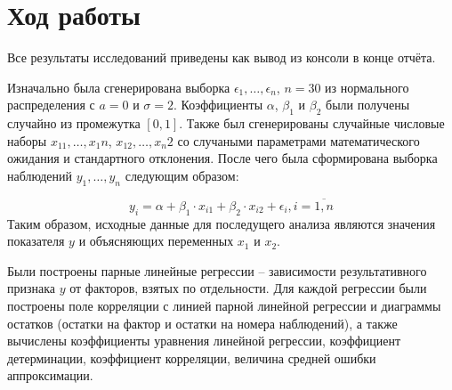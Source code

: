 \section{Ход работы}

Все результаты исследований приведены как вывод из консоли в конце отчёта.

Изначально была сгенерирована выборка $\epsilon_1, \ldots, \epsilon_n$, $n = 30$ из нормального распределения с $a = 0$ и $\sigma = 2$. Коэффициенты $\alpha$, $\beta_1$ и $\beta_2$ были получены случайно из промежутка $[0,1]$. Также был сгенерированы случайные числовые наборы $x_11, \ldots, x_1n$, $x_12, \ldots, x_n2$ со случаными параметрами математического ожидания и стандартного отклонения. После чего была сформирована выборка наблюдений $y_1, \ldots, y_n$ следующим образом:

\begin{equation}
	y_i = \alpha + \beta_1 \cdot x_{i1} + \beta_2 \cdot x_{i2} + \epsilon_i, i = \overline{1, n}
\end{equation}
Таким образом, исходные данные для последущего анализа являются значения показателя $y$ и объясняющих переменных $x_1$ и $x_2$.

Были построены парные линейные регрессии -- зависимости результативного признака $y$ от факторов, взятых по отдельности. Для каждой регрессии были построены поле корреляции с линией парной линейной регрессии и диаграммы остатков (остатки на фактор и остатки на номера наблюдений), а также вычислены коэффициенты уравнения линейной регрессии, коэффициент детерминации, коэффициент корреляции, величина средней ошибки аппроксимации. 

